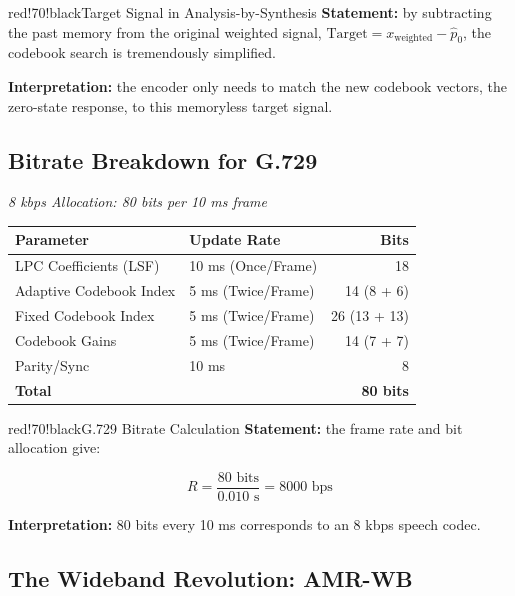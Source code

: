 \begin{calloutbox}{red!70!black}{Target Signal in Analysis-by-Synthesis}
\textbf{Statement:} by subtracting the past memory from the original weighted signal, $\text{Target} = x_{\text{weighted}} - \hat{p}_0$, the codebook search is tremendously simplified.

\textbf{Interpretation:} the encoder only needs to match the new codebook vectors, the zero-state response, to this memoryless target signal.
\end{calloutbox}

\subsection{Bitrate Breakdown for G.729}

\textit{8 kbps Allocation: 80 bits per 10 ms frame}

\begin{center}
\begin{tabular}{|l|l|r|}
\hline
\textbf{Parameter} & \textbf{Update Rate} & \textbf{Bits} \\ \hline
LPC Coefficients (LSF) & 10 ms (Once/Frame) & 18 \\ \hline
Adaptive Codebook Index & 5 ms (Twice/Frame) & 14 (8 + 6) \\ \hline
Fixed Codebook Index & 5 ms (Twice/Frame) & 26 (13 + 13) \\ \hline
Codebook Gains & 5 ms (Twice/Frame) & 14 (7 + 7) \\ \hline
Parity/Sync & 10 ms & 8 \\ \hline
\textbf{Total} &  & \textbf{80 bits} \\ \hline
\end{tabular}
\end{center}

\begin{calloutbox}{red!70!black}{G.729 Bitrate Calculation}
\textbf{Statement:} the frame rate and bit allocation give:

\[
R = \frac{80 \text{ bits}}{0.010 \text{ s}} = 8000 \text{ bps}
\]

\textbf{Interpretation:} 80 bits every 10 ms corresponds to an 8 kbps speech codec.
\end{calloutbox}

\subsection{The Wideband Revolution: AMR-WB}

